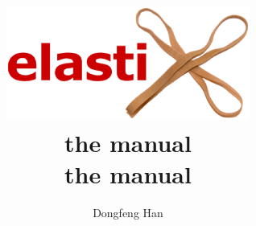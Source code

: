 \documentclass[]{report}
\begin{document}
\title{\includegraphics[width=8cm]{elastixLogo.eps}\\\vspace{1cm}the manual\vspace{1cm}}

\title{\\\vspace{1cm}the manual\vspace{1cm}}


\author{Dongfeng Han}
\maketitle

\setcounter{page}{1}  \tableofcontents
\newpage
{} \setcounter{page}{1}








\newpage
\pagestyle{plain} 


\end{document}
